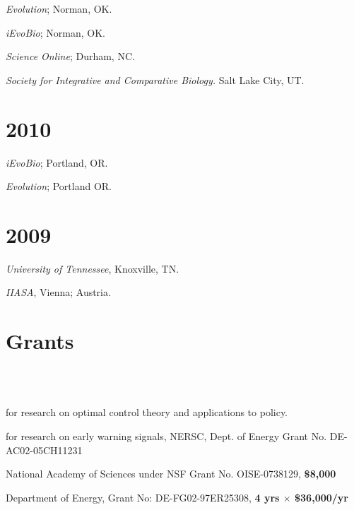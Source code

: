 \documentclass[margin]{res}
\begin{document}
\begin{resume}
  \emph{Evolution}; Norman, OK. 

  \emph{iEvoBio}; Norman, OK. 

  \emph{Science Online}; Durham, NC.

  \emph{Society for Integrative and Comparative Biology.} Salt Lake City, UT. 


 \section{\textnormal{2010}}
  \emph{iEvoBio}; Portland, OR. 

  \emph{Evolution}; Portland OR.

 \section{\textnormal{2009}}
 \emph{University of Tennessee}, Knoxville, TN.

 \emph{IIASA}, Vienna; Austria. 

\section{Grants}
\begin{format}
\\
\body\\
\end{format}

\begin{position} 
for research on optimal control theory and applications to policy.  
\end{position}

\begin{position} 
for research on early warning signals, NERSC, Dept. of Energy Grant No. DE-AC02-05CH11231
\end{position}

\begin{position} 
  National Academy of Sciences under NSF Grant No. OISE-0738129, \textbf{\$8,000}
\end{position}

\begin{position} 
  Department of Energy, Grant No: DE-FG02-97ER25308, \textbf{4 yrs $\times$ \$36,000/yr}
\end{position}



\end{resume}
\end{document}
